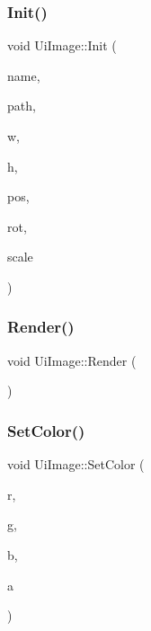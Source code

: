 \subsubsection{\texorpdfstring{Init()}{Init()}}
{\footnotesize\ttfamily void Ui\+Image\+::\+Init (\begin{DoxyParamCaption}\item[{const std\+::string \&}]{name,  }\item[{W\+C\+H\+AR $\ast$}]{path,  }\item[{const float}]{w,  }\item[{const float}]{h,  }\item[{const \mbox{\hyperlink{common_8h_ab1cb35b3a17c398d8ef71d5f779808bf}{Vec3}} \&}]{pos,  }\item[{const \mbox{\hyperlink{common_8h_ab1cb35b3a17c398d8ef71d5f779808bf}{Vec3}} \&}]{rot,  }\item[{const \mbox{\hyperlink{common_8h_ab1cb35b3a17c398d8ef71d5f779808bf}{Vec3}} \&}]{scale }\end{DoxyParamCaption})}

\mbox{\label{class_ui_image_a2f0a08734b368e32b8cbd9f7682e0413}} 
\subsubsection{\texorpdfstring{Render()}{Render()}}
{\footnotesize\ttfamily void Ui\+Image\+::\+Render (\begin{DoxyParamCaption}{ }\end{DoxyParamCaption})}

\mbox{\label{class_ui_image_a2fa9658d867a9f50da24f655ae92396c}} 
\subsubsection{\texorpdfstring{Set\+Color()}{SetColor()}}
{\footnotesize\ttfamily void Ui\+Image\+::\+Set\+Color (\begin{DoxyParamCaption}\item[{const float}]{r,  }\item[{const float}]{g,  }\item[{const float}]{b,  }\item[{const float}]{a }\end{DoxyParamCaption})\hspace{0.3cm}{\ttfamily [inline]}}

